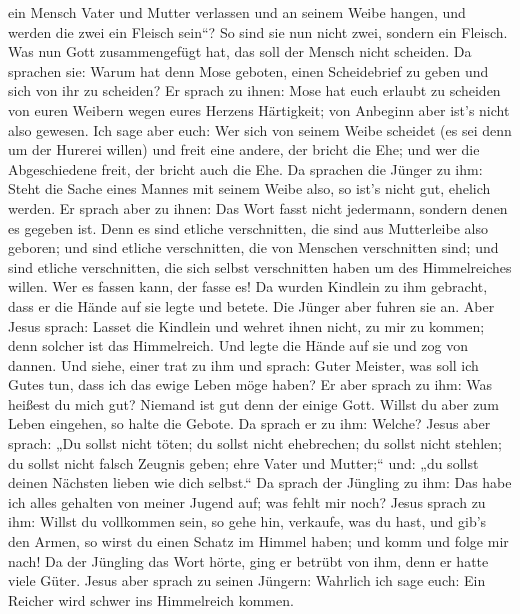ein Mensch Vater und Mutter verlassen und an seinem Weibe hangen, und
werden die zwei ein Fleisch sein``?  So sind sie nun nicht
zwei, sondern ein Fleisch. Was nun Gott zusammengefügt hat, das soll der
Mensch nicht scheiden.  Da sprachen sie: Warum hat denn Mose
geboten, einen Scheidebrief zu geben und sich von ihr zu scheiden?
 Er sprach zu ihnen: Mose hat euch erlaubt zu scheiden von
euren Weibern wegen eures Herzens Härtigkeit; von Anbeginn aber ist's
nicht also gewesen.  Ich sage aber euch: Wer sich von seinem
Weibe scheidet (es sei denn um der Hurerei willen) und freit eine
andere, der bricht die Ehe; und wer die Abgeschiedene freit, der bricht
auch die Ehe.  Da sprachen die Jünger zu ihm: Steht die
Sache eines Mannes mit seinem Weibe also, so ist's nicht gut, ehelich
werden.  Er sprach aber zu ihnen: Das Wort fasst nicht
jedermann, sondern denen es gegeben ist.  Denn es sind
etliche verschnitten, die sind aus Mutterleibe also geboren; und sind
etliche verschnitten, die von Menschen verschnitten sind; und sind
etliche verschnitten, die sich selbst verschnitten haben um des
Himmelreiches willen. Wer es fassen kann, der fasse es!  Da
wurden Kindlein zu ihm gebracht, dass er die Hände auf sie legte und
betete. Die Jünger aber fuhren sie an.  Aber Jesus sprach:
Lasset die Kindlein und wehret ihnen nicht, zu mir zu kommen; denn
solcher ist das Himmelreich.  Und legte die Hände auf sie
und zog von dannen.  Und siehe, einer trat zu ihm und
sprach: Guter Meister, was soll ich Gutes tun, dass ich das ewige Leben
möge haben?  Er aber sprach zu ihm: Was heißest du mich
gut? Niemand ist gut denn der einige Gott. Willst du aber zum Leben
eingehen, so halte die Gebote.  Da sprach er zu ihm:
Welche? Jesus aber sprach: „Du sollst nicht töten; du sollst nicht
ehebrechen; du sollst nicht stehlen; du sollst nicht falsch Zeugnis
geben;  ehre Vater und Mutter;`` und: „du sollst deinen
Nächsten lieben wie dich selbst.``  Da sprach der Jüngling
zu ihm: Das habe ich alles gehalten von meiner Jugend auf; was fehlt mir
noch?  Jesus sprach zu ihm: Willst du vollkommen sein, so
gehe hin, verkaufe, was du hast, und gib's den Armen, so wirst du einen
Schatz im Himmel haben; und komm und folge mir nach!  Da
der Jüngling das Wort hörte, ging er betrübt von ihm, denn er hatte
viele Güter.  Jesus aber sprach zu seinen Jüngern: Wahrlich
ich sage euch: Ein Reicher wird schwer ins Himmelreich kommen.
